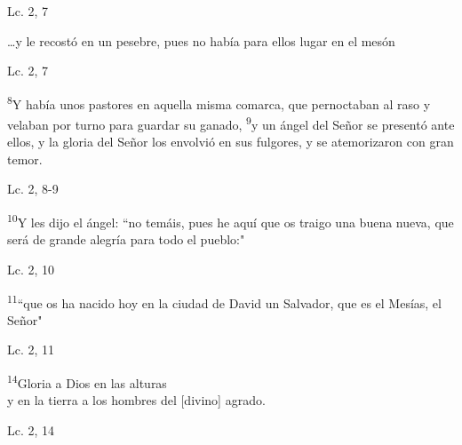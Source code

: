 \documentclass[a4paper,11pt]{article}
\begin{document}
      \begin{center}
        Lc. 2, 7          
      \end{center}
      
      \begin{center}
        \ldots y le recostó en un pesebre, pues no había para ellos lugar en el mesón
      \end{center}
      
      \begin{center}
        Lc. 2, 7         
      \end{center}
      
      \begin{center}
        \textsuperscript{8}Y había unos pastores en aquella misma comarca, que pernoctaban al raso y velaban por turno para guardar su ganado, \textsuperscript{9}y un ángel
        del Señor se presentó ante ellos, y la gloria del Señor los envolvió en sus fulgores, y se atemorizaron con gran temor.
      \end{center}
      \begin{center}
        Lc. 2, 8-9         
      \end{center}
      
      \begin{center}
        \textsuperscript{10}Y les dijo el ángel: ``no temáis, pues he aquí que os traigo una buena nueva, que será de grande alegría para todo el pueblo:"
      \end{center}
      \begin{center}
        Lc. 2, 10         
      \end{center}

      \begin{center}
        \textsuperscript{11}``que os ha nacido hoy en la ciudad de David un Salvador, que es el Mesías, el Señor"
      \end{center}
      \begin{center}
        Lc. 2, 11       
      \end{center}
      
      \begin{center}
        \textsuperscript{14}Gloria a Dios en las alturas \\
        y en la tierra a los hombres del [divino] agrado.
      \end{center}

      \begin{center}
        Lc. 2, 14        
      \end{center}
      
\end{document}
